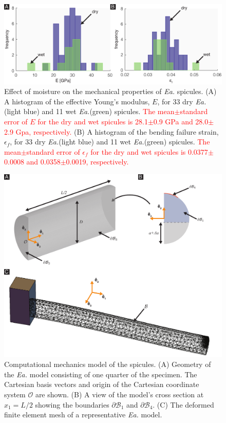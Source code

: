 \documentclass[12pt,onecolumn]{article}
\makeatletter
\newcommand{\EA}{\textit{Ea.\@}\xspace}
\makeatother
\begin{document}
\begin{bibunit}
 	\begin{figure}[H]
	\centering
	\includegraphics[width=\textwidth]{../Figures/FigureHyd/FigureA3_V1.pdf}
	\caption{Effect of moisture on the mechanical properties of \EA spicules. (A) A histogram of the effective Young's modulus, $E$, for 33 dry \EA (light blue) and 11 wet \EA (green) spicules. \textcolor{red}{The mean$\pm$standard error of $E$ for the dry and wet spicules is 28.1$\pm$0.9 GPa and 28.0$\pm$2.9 Gpa, respectively.} (B) A histogram of the bending failure strain, $\epsilon_f$, for 33 dry \EA (light blue) and 11 wet \EA (green) spicules. \textcolor{red}{The mean$\pm$standard error of $\epsilon_f$ for the dry and wet spicules is 0.0377$\pm$0.0008 and 0.0358$\pm$0.0019, respectively.}}
	\label{fig:hyd}
	\end{figure}
	
	\begin{figure}[H]
	\centering
	\includegraphics[width=\textwidth]{../Figures/FigureFEA/FigureA2_V7.pdf}
	\caption{Computational mechanics model of the spicules. (A) Geometry of the \EA model consisting of one quarter of the specimen. The Cartesian basis vectors and origin of the Cartesian coordinate system $\mathcal{O}$ are shown. (B) A view of the model's cross section at $x_1=L/2$ showing the boundaries $\partial \mathcal{B}_1$ and $\partial \mathcal{B}_4$. (C) The deformed finite element mesh of a representative \EA model.}
	\label{fig:FEA}
	\end{figure}
	

\end{bibunit}
\end{document}
